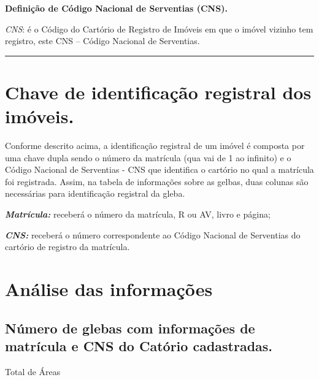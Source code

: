\documentclass[
  letterpaper,
]{report}
\begin{document}
\textbf{Definição de Código Nacional de Serventias (CNS).}

\emph{CNS}: é o Código do Cartório de Registro de Imóveis em que o
imóvel vizinho tem registro, este CNS -- Código Nacional de Serventias.

\begin{center}\rule{0.5\linewidth}{0.5pt}\end{center}

\hypertarget{chave-de-identificauxe7uxe3o-registral-dos-imuxf3veis.}{%
\section{Chave de identificação registral dos
imóveis.}\label{chave-de-identificauxe7uxe3o-registral-dos-imuxf3veis.}}

Conforme descrito acima, a identificação registral de um imóvel é
composta por uma chave dupla sendo o número da matrícula (qua vai de 1
ao infinito) e o Código Nacional de Serventias - CNS que identifica o
cartório no qual a matrícula foi registrada. Assim, na tabela de
informações sobre as gelbas, duas colunas são necessárias para
identificação registral da gleba.

\emph{\textbf{Matrícula:}} receberá o número da matrícula, R ou AV,
livro e página;

\emph{\textbf{CNS:}} receberá o número correspondente ao Código Nacional
de Serventias do cartório de registro da matrícula.

\hypertarget{anuxe1lise-das-informauxe7uxf5es}{%
\section{Análise das
informações}\label{anuxe1lise-das-informauxe7uxf5es}}

\hypertarget{nuxfamero-de-glebas-com-informauxe7uxf5es-de-matruxedcula-e-cns-do-catuxf3rio-cadastradas.}{%
\subsection{Número de glebas com informações de matrícula e CNS do
Catório
cadastradas.}\label{nuxfamero-de-glebas-com-informauxe7uxf5es-de-matruxedcula-e-cns-do-catuxf3rio-cadastradas.}}

\n  

\n    

\n      

Total de Áreas

\n      
\end{document}
